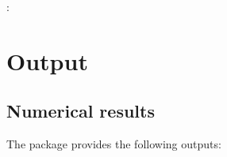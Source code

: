 \documentclass[letterpaper,10pt,english]{sphinxmanual}
\begin{document}
\sphinxAtStartPar
{}:
\begin{quote}

\end{quote}


\section{Output}
\label{\detokenize{Specifications/Output:output}}\label{\detokenize{Specifications/Output:id1}}\label{\detokenize{Specifications/Output::doc}}

\subsection{Numerical results}
\label{\detokenize{Specifications/Output:numerical-results}}
\sphinxAtStartPar
The package provides the following outputs:
\end{document}
